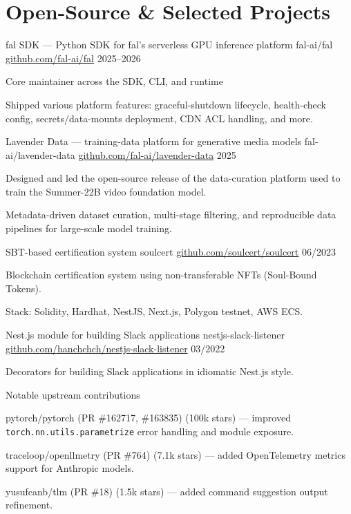 \section{Open-Source \& Selected Projects}

\cventry
{fal SDK --- Python SDK for fal's serverless GPU inference platform}
{fal-ai/fal}
{\href{https://github.com/fal-ai/fal}{github.com/fal-ai/fal}}
{2025--2026}
\begin{cvitems}
\item {Core maintainer across the SDK, CLI, and runtime}
\item {Shipped various platform features: graceful-shutdown lifecycle, health-check config, secrets/data-mounts deployment, CDN ACL handling, and more.}
\end{cvitems}

\cventry
{Lavender Data --- training-data platform for generative media models}
{fal-ai/lavender-data}
{\href{https://github.com/fal-ai/lavender-data}{github.com/fal-ai/lavender-data}}
{2025}
\begin{cvitems}
\item {Designed and led the open-source release of the data-curation platform used to train the Summer-22B video foundation model.}
\item {Metadata-driven dataset curation, multi-stage filtering, and reproducible data pipelines for large-scale model training.}
\end{cvitems}

\cventry
{SBT-based certification system}
{soulcert}
{\href{https://github.com/soulcert/soulcert}{github.com/soulcert/soulcert}}
{06/2023}
\begin{cvitems}
\item {Blockchain certification system using non-transferable NFTs (Soul-Bound Tokens).}
\item {Stack: Solidity, Hardhat, NestJS, Next.js, Polygon testnet, AWS ECS.}
\end{cvitems}

\cventry
{Nest.js module for building Slack applications}
{nestjs-slack-listener}
{\href{https://github.com/hanchchch/nestjs-slack-listener}{github.com/hanchchch/nestjs-slack-listener}}
{03/2022}
\begin{cvitems}
\item {Decorators for building Slack applications in idiomatic Nest.js style.}
\end{cvitems}

\cventry
{Notable upstream contributions}
{}
{}
{}
\begin{cvitems}
\item {pytorch/pytorch (PR \#162717, \#163835) (100k stars) --- improved \texttt{torch.nn.utils.parametrize} error handling and module exposure.}
\item {traceloop/openllmetry (PR \#764) (7.1k stars) --- added OpenTelemetry metrics support for Anthropic models.}
\item {yusufcanb/tlm (PR \#18) (1.5k stars) --- added command suggestion output refinement.}
\end{cvitems}
